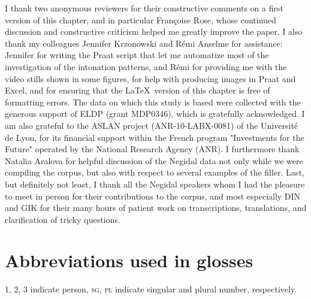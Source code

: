 \documentclass[output=paper]{langscibook}
\begin{document}
I thank two anonymous reviewers for their constructive comments on a first version of this chapter, and in particular Françoise Rose, whose continued discussion and constructive criticism helped me greatly improve the paper. I also thank my colleagues Jennifer Krzonowski and Rémi Anselme for assistance: Jennifer for writing the Praat script that let me automatize most of the investigation of the intonation patterns, and Rémi for providing me with the video stills shown in some figures, for help with producing images in Praat and Excel, and for ensuring that the \LaTeX~version of this chapter is free of formatting errors. The data on which this study is based were collected with the generous support of ELDP (grant MDP0346), which is gratefully acknowledged. I am also grateful to the ASLAN project (ANR-10-LABX-0081) of the Université de Lyon, for its financial support within the French program "Investments for the Future" operated by the National Research Agency (ANR). I furthermore thank Natalia Aralova for helpful discussion of the Negidal data not only while we were compiling the corpus, but also with respect to several examples of the filler. Last, but definitely not least, I thank all the Negidal speakers whom I had the pleasure to meet in person for their contributions to the corpus, and most especially DIN and GIK for their many hours of patient work on transcriptions, translations, and clarification of tricky questions.

\section*{Abbreviations used in glosses}

1, 2, 3 indicate person, \textsc{sg}, \textsc{pl} indicate singular and plural number, respectively.
\medskip
\end{document}
